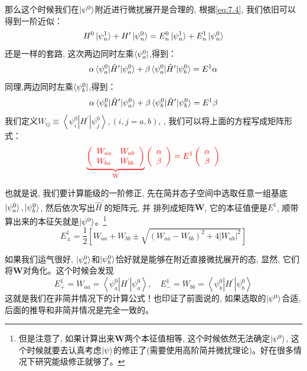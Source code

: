 \documentclass[a4paper,zihao=-4,linespread=1]{ctexrep}
\begin{document}
    那么这个时候我们在$\ket{\psi^0}$附近进行微扰展开是合理的, 根据\ref{eq:7.4}, 我们依旧可以得到一阶近似：
    \[H^0 \ket{\psi_n^1}+H^{\prime} \ket{\psi_n^0}=E_n^0 \ket{\psi_n^1}+E_n^1 \ket{\psi_n^0}\]
    还是一样的套路, 这次两边同时左乘$\bra{\psi_a^0}$,得到：
    \[\alpha\braket{\psi_a^0|\hat{H}^\prime|\psi_a^0}+\beta\braket{\psi_a^0|\hat{H}^\prime|\psi_b^0}=E^1 \alpha\]
    同理,两边同时左乘$\bra{\psi_b^0}$,得到：
    \[\alpha\braket{\psi_b^0|\hat{H}^\prime|\psi_a^0}+\beta\braket{\psi_b^0|\hat{H}^\prime|\psi_b^0}=E^1 \beta\]
    我们定义$W_{i j} \equiv\left\langle\psi_{i}^{0}\left|H^{\prime}\right| \psi_{j}^{0}\right\rangle , (i, j=a, b) $, , 我们可以将上面的方程写成矩阵形式：
    \begin{equation}
        {\color{red}
            \underbrace{\left(\begin{array}{ll}
                W_{a a} & W_{a b} \\
                W_{b a} & W_{b b}
                \end{array}\right)}_{\mathrm{W}}\left(\begin{array}{l}
                \alpha \\
                \beta
                \end{array}\right)=E^{1}\left(\begin{array}{c}
                \alpha \\
                \beta
                \end{array}\right) 
        }
    \end{equation}
    
    也就是说, 我们要计算能级的一阶修正, 先在简并态子空间中选取任意一组基底${\ket{\psi_a^0},\ket{\psi_b^0}}$, 然后依次写出$\hat{H}^\prime$的矩阵元, 并
    排列成矩阵$\mathbf{W}$, 它的本征值便是$E^1$, 顺带算出来的本征矢就是$\ket{\psi^0}$。\footnote{但是注意了, 如果计算出来$\mathbf{W}$两个本征值相等, 这个时候依然无法确定$\ket{\psi^0}$, 这个时候就要去认真考虑$\ket{\psi}$的修正了(需要使用高阶简并微扰理论)。好在很多情况下研究能级修正就够了。}
    \begin{equation}
        \boxed{E_{\pm}^{1}=\frac{1}{2}\left[W_{a a}+W_{b b} \pm \sqrt{\left(W_{a a}-W_{b b}\right)^{2}+4\left|W_{a b}\right|^{2}}\right]}
    \end{equation}
    
    如果我们运气很好, $\ket{\psi_a^0}$和$\ket{\psi_b^0}$恰好就是能够在附近直接微扰展开的态, 显然, 它们将$\mathbf{W}$对角化。这个时候会发现
    \[E_{+}^{1}=W_{a a}=\left\langle\psi_{a}^{0}\left|H^{\prime}\right| \psi_{a}^{0}\right\rangle, \quad E_{-}^{1}=W_{b b}=\left\langle\psi_{b}^{0}\left|H^{\prime}\right| \psi_{b}^{0}\right\rangle\]
    这就是我们在非简并情况下的计算公式！也印证了前面说的, 如果选取的$\ket{\psi^0}$合适, 后面的推导和非简并情况是完全一致的。
\end{document}
